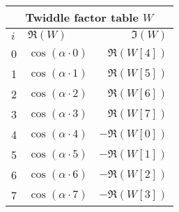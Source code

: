 \begin{tabular}{|l|l|r|}
	\multicolumn{3}{c}{Twiddle factor table $W$} \\ \hline
	$i$ & $\Re(W)$ & $\Im(W)$ \\ \hline
	0 & $\cos(\alpha \cdot 0)$ & $\Re(W[4])$ \\
	1 & $\cos(\alpha \cdot 1)$ & $\Re(W[5])$ \\
	2 & $\cos(\alpha \cdot 2)$ & $\Re(W[6])$ \\
	3 & $\cos(\alpha \cdot 3)$ & $\Re(W[7])$ \\	
	4 & $\cos(\alpha \cdot 4)$ & $-\Re(W[0])$ \\
	5 & $\cos(\alpha \cdot 5)$ & $-\Re(W[1])$ \\
	6 & $\cos(\alpha \cdot 6)$ & $-\Re(W[2])$ \\
	7 & $\cos(\alpha \cdot 7)$ & $-\Re(W[3])$ \\ \hline
\end{tabular}